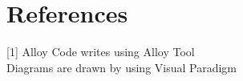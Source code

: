 \section{References}
[1]  Alloy Code writes using Alloy Tool\\
[2]  Diagrams are drawn by using Visual Paradigm